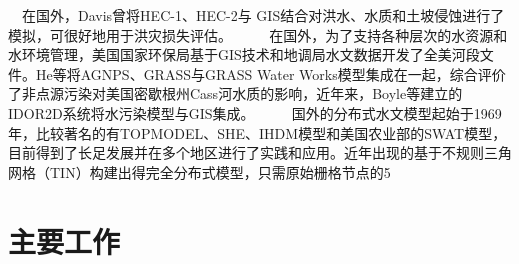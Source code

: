 　在国外，Davis曾将HEC-1、HEC-2与 GIS结合对洪水、水质和土坡侵蚀进行了模拟，可很好地用于洪灾损失评估。
　
　在国外，为了支持各种层次的水资源和水环境管理，美国国家环保局基于GIS技术和地调局水文数据开发了全美河段文件。He等将AGNPS、GRASS与GRASS Water Works模型集成在一起，综合评价了非点源污染对美国密歇根州Cass河水质的影响，近年来，Boyle等建立的IDOR2D系统将水污染模型与GIS集成。
　
　国外的分布式水文模型起始于1969年，比较著名的有TOPMODEL、SHE、IHDM模型和美国农业部的SWAT模型，目前得到了长足发展并在多个地区进行了实践和应用。近年出现的基于不规则三角网格（TIN）构建出得完全分布式模型，只需原始栅格节点的5%
\section{主要工作}

